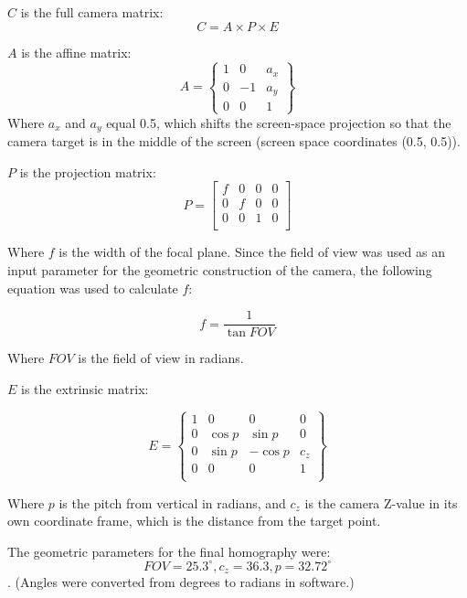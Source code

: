 \documentclass{article}
\begin{document}
	
$C$ is the full camera matrix:
\begin{equation}
	C = A \times P \times E
\end{equation}

$A$ is the affine matrix:
\begin{equation}
	A = \begin{Bmatrix}
		1 & 0 & a_x \\
		0 & -1 & a_y \\
		0 & 0 & 1
	\end{Bmatrix}
\end{equation}
Where $a_x$ and $a_y$ equal 0.5, which shifts the screen-space projection so that the camera target is in the middle of the screen (screen space coordinates (0.5, 0.5)).
	
$P$ is the projection matrix:
\begin{equation}
	P = \begin{bmatrix}
		f & 0 & 0 & 0 \\
		0 & f & 0 & 0 \\
		0 & 0 & 1 & 0 \\
	\end{bmatrix}
\end{equation}

Where $f$ is the width of the focal plane.  Since the field of view was used as an input parameter for the geometric construction of the camera, the following equation was used to calculate $f$:

\begin{equation}
	f = \frac{1}{\tan FOV}
\end{equation}

Where $FOV$ is the field of view in radians.

$E$ is the extrinsic matrix:

\begin{equation}
	E = \begin{Bmatrix}
		1 & 0 & 0 & 0 \\
		0 & \cos p & \sin p & 0 \\
		0 & \sin p & -\cos p & c_z \\
		0 & 0 & 0 & 1 \\
	\end{Bmatrix}
\end{equation}

Where $p$ is the pitch from vertical in radians, and $c_z$ is the camera Z-value in its own coordinate frame, which is the distance from the target point.

The geometric parameters for the final homography were: $$FOV=25.3^\circ, c_z = 36.3, p = 32.72^\circ$$.  (Angles were converted from degrees to radians in software.)
\end{document}
